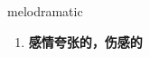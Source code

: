 
\begin{frame}
{\huge melodramatic}
\begin{center}
\begin{enumerate}\Large
  \item \textbf{感情夸张的，伤感的}
\end{enumerate}
\end{center}
\end{frame}
